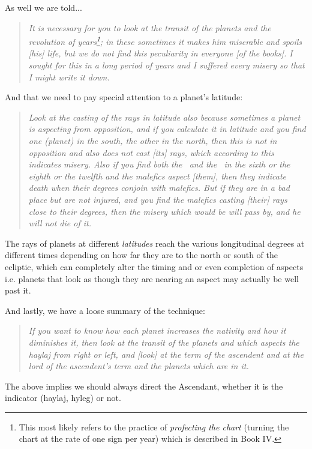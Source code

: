 \noindent As well we are told...
\begin{quote}
\textsl{It is necessary for you to look at the transit of the planets and the revolution of years\footnote{This most likely refers to the practice of \textsl{profecting the chart} (turning the chart at the rate of one sign per year) which is described in Book IV.}; in these sometimes it makes him miserable and spoils [his] life, but we do not find this peculiarity in everyone [of the books]. I sought for this in a long period of years and I suffered every misery so that I might write it down.}
\end{quote}
\noindent And that we need to pay special attention to a planet's latitude:
\begin{quote}
\textsl{Look at the casting of the rays in latitude also because sometimes a planet is aspecting from opposition, and if you calculate it in latitude and you find one (planet) in the south, the other in the north, then this is not in opposition and also does not cast [its] rays, which according to this indicates misery. Also if you find both the \Sun\, and the \Moon\, in the sixth or the eighth or the twelfth and the malefics aspect [them], then they indicate death when their degrees conjoin with malefics. But if they are in a bad place but are not injured, and you find the malefics casting [their] rays close to their degrees, then the misery which would be will pass by, and he will not die of it.}
\end{quote}

The rays of planets at different \textsl{latitudes} reach the various longitudinal degrees at different times depending on how far they are to the north or south of the ecliptic, which can completely alter the timing and or even completion of aspects i.e. planets that look as though they are nearing an aspect may actually be well past it.

\noindent And lastly, we have a loose summary of the technique:
\begin{quote}
\textsl{If you want to know how each planet increases the nativity and how it diminishes it, then look at the transit of the planets and which aspects the haylaj from right or left, and [look] at the term of the ascendent and at the lord of the ascendent's term and the planets which are in it.}
\end{quote}
The above implies we should always direct the Ascendant, whether it is the indicator (haylaj, hyleg) or not.

